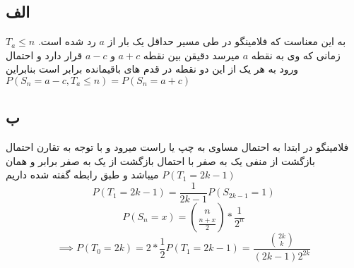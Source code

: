 \subsection*{الف}
	$T_a \leq n$ به این معناست که فلامینگو در طی مسیر حداقل یک بار از $a$ رد شده است. زمانی که وی به نقطه $a$ میرسد دقیقن بین نقطه $a+c$ و $a-c$ قرار دارد و احتمال ورود به هر یک از این دو نقطه در قدم های باقیمانده برابر است بنابراین $P(S_n = a-c,T_a\leq n) = P(S_n = a+c)$\\
\subsection*{ب}
فلامینگو در ابتدا به احتمال مساوی به چپ یا راست میرود و با توجه به تقارن احتمال بازگشت از منفی یک به صفر با احتمال بازگشت از یک به صفر برابر و همان $P(T_1 = 2k-1)$ میباشد و طبق رابطه گفته شده داریم \\
$$P(T_1 = 2k-1) = \frac{1}{2k-1}P(S_{2k-1} = 1)$$
$$P(S_n = x) = {n \choose \frac{n+x}{2}}*\frac{1}{2^n}$$
$$\implies P(T_0=2k) = 2*\frac{1}{2}P(T_1=2k-1) = \frac{{2k \choose k}}{(2k-1)2^{2k}}$$


